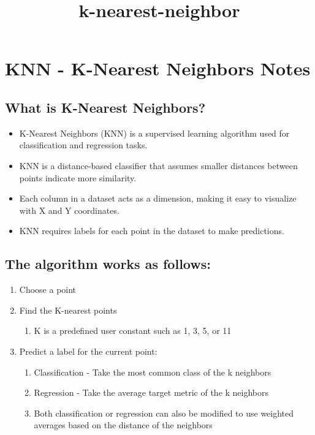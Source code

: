 \documentclass[11pt]{article}
\title{k-nearest-neighbor}
\providecommand{\tightlist}{%
      \setlength{\itemsep}{0pt}\setlength{\parskip}{0pt}}
\begin{document}
    
    \maketitle
    
    

    
    \hypertarget{knn---k-nearest-neighbors-notes}{%
\section{KNN - K-Nearest Neighbors
Notes}\label{knn---k-nearest-neighbors-notes}}

\hypertarget{what-is-k-nearest-neighbors}{%
\subsection{What is K-Nearest
Neighbors?}\label{what-is-k-nearest-neighbors}}

\begin{itemize}
\tightlist
\item
  K-Nearest Neighbors (KNN) is a supervised learning algorithm used for
  classification and regression tasks.
\item
  KNN is a distance-based classifier that assumes smaller distances
  between points indicate more similarity.
\item
  Each column in a dataset acts as a dimension, making it easy to
  visualize with X and Y coordinates.
\item
  KNN requires labels for each point in the dataset to make predictions.
\end{itemize}

\hypertarget{the-algorithm-works-as-follows}{%
\subsection{The algorithm works as
follows:}\label{the-algorithm-works-as-follows}}

\begin{enumerate}
\def\labelenumi{\arabic{enumi}.}
\tightlist
\item
  Choose a point
\item
  Find the K-nearest points

  \begin{enumerate}
  \def\labelenumii{\arabic{enumii}.}
  \tightlist
  \item
    K is a predefined user constant such as 1, 3, 5, or 11
  \end{enumerate}
\item
  Predict a label for the current point:

  \begin{enumerate}
  \def\labelenumii{\arabic{enumii}.}
  \tightlist
  \item
    Classification - Take the most common class of the k neighbors
  \item
    Regression - Take the average target metric of the k neighbors
  \item
    Both classification or regression can also be modified to use
    weighted averages based on the distance of the neighbors
  \end{enumerate}
\end{enumerate}
\end{document}
